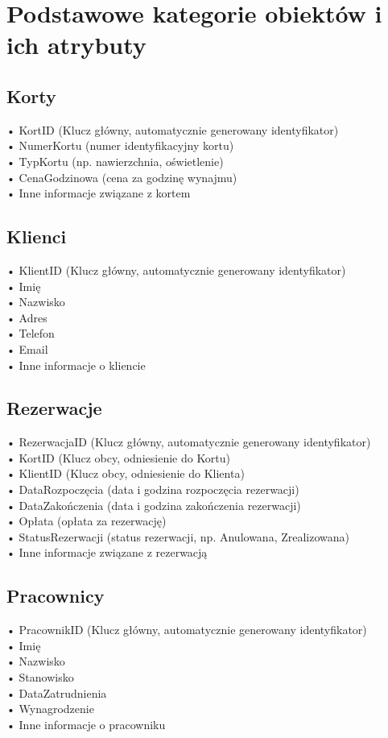 \documentclass{article}
\begin{document}
\section*{Podstawowe kategorie obiektów i ich atrybuty}

\subsection*{Korty}
•	KortID (Klucz główny, automatycznie generowany identyfikator)\\
•	NumerKortu (numer identyfikacyjny kortu)\\
•	TypKortu (np. nawierzchnia, oświetlenie)\\
•	CenaGodzinowa (cena za godzinę wynajmu)\\
•	Inne informacje związane z kortem\\

\subsection*{Klienci}
•	KlientID (Klucz główny, automatycznie generowany identyfikator)\\
•	Imię\\
•	Nazwisko\\
•	Adres\\
•	Telefon\\
•	Email\\
•	Inne informacje o kliencie

\subsection*{Rezerwacje}
•	RezerwacjaID (Klucz główny, automatycznie generowany identyfikator)\\
•	KortID (Klucz obcy, odniesienie do Kortu)\\
•	KlientID (Klucz obcy, odniesienie do Klienta)\\
•	DataRozpoczęcia (data i godzina rozpoczęcia rezerwacji)\\
•	DataZakończenia (data i godzina zakończenia rezerwacji)\\
•	Opłata (opłata za rezerwację)\\
•	StatusRezerwacji (status rezerwacji, np. Anulowana, Zrealizowana)\\
•	Inne informacje związane z rezerwacją\\

\subsection*{Pracownicy}
•	PracownikID (Klucz główny, automatycznie generowany identyfikator)\\
•	Imię\\
•	Nazwisko\\
•	Stanowisko\\
•	DataZatrudnienia\\
•	Wynagrodzenie\\
•	Inne informacje o pracowniku
\end{document}
